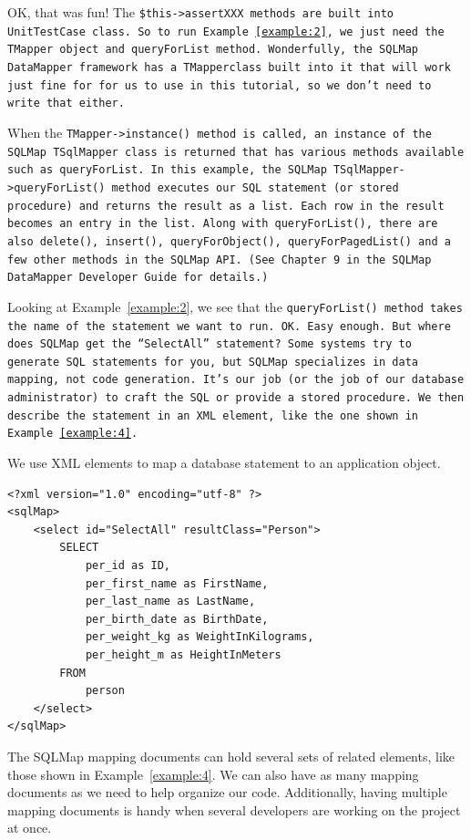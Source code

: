 OK, that was fun! The \tt{\$this->assertXXX} methods are built into
\tt{UnitTestCase} class. So to run Example~\ref{example:2}, we just need the
\tt{TMapper} object and \tt{queryForList} method. Wonderfully, the SQLMap
DataMapper framework has a \tt{TMapper}class built into it that will work just
fine for for us to use in this tutorial, so we don't need to write that
either.

When the \tt{TMapper->instance()} method is called, an instance of the SQLMap
\tt{TSqlMapper} class is returned that has various methods available such as
\tt{queryForList}. In this example, the SQLMap \tt{TSqlMapper->queryForList()}
method executes our SQL statement (or stored procedure) and returns the result
as a list. Each row in the result becomes an entry in the list. Along with
\tt{queryForList()}, there are also \tt{delete()}, \tt{insert()},
\tt{queryForObject()}, \tt{queryForPagedList()} and a few other methods in the
SQLMap API. (See Chapter 9 in the SQLMap DataMapper Developer Guide for
details.)

Looking at Example~\ref{example:2}, we see that the \tt{queryForList()} method
takes the name of the statement we want to run. OK. Easy enough. But where
does SQLMap get the ``SelectAll'' statement? Some systems try to generate SQL
statements for you, but SQLMap specializes in data mapping, not code
generation. It's our job (or the job of our database administrator) to craft
the SQL or provide a stored procedure. We then describe the statement in an
XML element, like the one shown in Example~\ref{example:4}.

\begin{example}\label{example:4}
We use XML elements to map a database statement to an application object.
\begin{verbatim}
<?xml version="1.0" encoding="utf-8" ?>
<sqlMap>
    <select id="SelectAll" resultClass="Person">
        SELECT
            per_id as ID,
            per_first_name as FirstName,
            per_last_name as LastName,
            per_birth_date as BirthDate,
            per_weight_kg as WeightInKilograms,
            per_height_m as HeightInMeters
        FROM
            person
    </select>
</sqlMap>
\end{verbatim}
\end{example}

The SQLMap mapping documents can hold several sets of related elements, like
those shown in Example~\ref{example:4}. We can also have as many mapping
documents as we need to help organize our code. Additionally, having multiple
mapping documents is handy when several developers are working on the project
at once.

